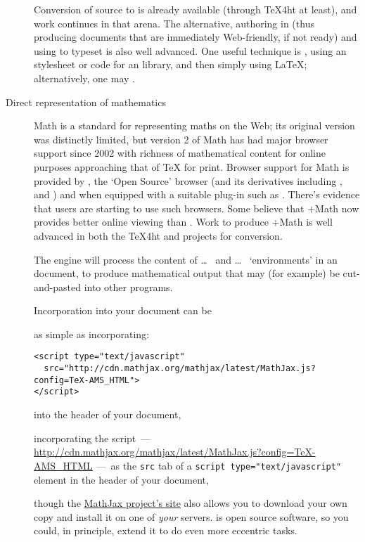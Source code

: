 \begin{description}
  Conversion of \AllTeX{} source to  is already available
  (through \TeX{}4ht at least), and work continues in that arena.  The
  alternative, authoring in  (thus producing documents that
  are immediately Web-friendly, if not ready) and using \AllTeX{} to
  typeset is also well advanced.  One useful technique is
  ,
  using an  stylesheet or code for an  library,
  and then simply using \LaTeX{}; alternatively, one may
  .
\item[Direct representation of mathematics]
  Math is a standard for representing maths on the Web; its
  original version was distinctly limited, but version 2 of Math
  has had major browser support since 2002 with richness of mathematical
  content for online purposes approaching that of \TeX{} for print.
  Browser support for Math is provided by , the
  `Open Source' browser  (and its derivatives
  including ,  and ) and
   when equipped with a suitable plug-in
  such as .
  There's evidence that \AllTeX{} users are starting to use such
  browsers.  Some believe that +Math now provides
  better online viewing than .
  Work to produce +Math is well advanced in both the
  \TeX{}4ht and  projects for \AllTeX{} conversion.

  The \href{http://www.mathjax.org}{} engine will process the
  content of \latex{} \csx{[} \dots{}~\csx{]} and \csx{(} \dots{}~\csx{)}
  `environments' in an  document, to produce mathematical
  output that may (for example) be cut-and-pasted into other programs.

  Incorporation into your document can be
\begin{wideversion}
  as simple as incorporating:
\begin{verbatim}
<script type="text/javascript"
  src="http://cdn.mathjax.org/mathjax/latest/MathJax.js?config=TeX-AMS_HTML">
</script>
\end{verbatim}
  into the header of your  document,
\end{wideversion}
\begin{narrowversion}
  incorporating the script~---
  \url{http://cdn.mathjax.org/mathjax/latest/MathJax.js?config=TeX-AMS_HTML}
  ---~as the \texttt{src} tab of a \texttt{script type="text/javascript"}
  element in the header of your  document,
\end{narrowversion}
  though the \href{http://www.mathjax.org/}{MathJax project's site}
  also allows you to download your own copy and install it on one of
  \emph{your} servers.   is open source software, so
  you could, in principle, extend it to do even more eccentric tasks.


\end{description}

